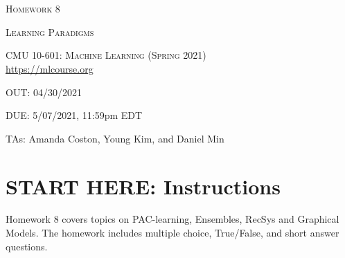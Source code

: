 \documentclass[11pt,addpoints,answers]{exam}
\begin{document}
\section*{}
\begin{center}
  \centerline{\textsc{\LARGE  Homework 8}}
  \vspace{0.5em}
  \centerline{\textsc{\LARGE Learning Paradigms}}
  \textsc{\large CMU 10-601: Machine Learning (Spring 2021)} \\
  \url{https://mlcourse.org}
  \centerline{OUT: 04/30/2021}
  \centerline{DUE: 5/07/2021, 11:59pm EDT}
  \centerline{TAs: Amanda Coston, Young Kim, and Daniel Min}
\end{center}


\section*{START HERE: Instructions}

\begin{notebox}
Homework 8 covers topics on PAC-learning, Ensembles, RecSys and Graphical Models. The homework includes multiple choice, True/False, and short answer questions. 
\end{notebox}
\end{document}
